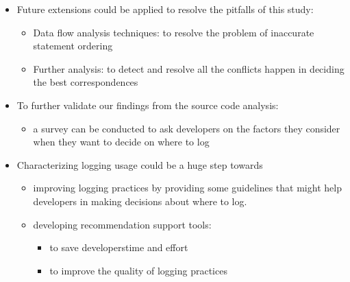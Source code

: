 \begin{itemize} [leftmargin=.01in]
\section{Future Work}  \label{fw}
\item Future extensions could be applied to resolve the pitfalls of this study:
\begin{itemize} [leftmargin=.3in]
\item Data flow analysis techniques: to resolve the problem of inaccurate statement ordering
\item Further analysis: to detect and resolve all the conflicts happen in deciding the best correspondences
\end{itemize}
\item To further validate our findings from the source code analysis:
\begin{itemize} [leftmargin=.3in]
\item a survey can be conducted to ask developers on the factors they consider when they want to decide on where to log
\end{itemize}
\item Characterizing logging usage could be a huge step towards
\begin{itemize} [leftmargin=.3in]
\item improving logging practices by providing some guidelines that might help developers in making decisions about where to
log.
\item developing recommendation support tools:
\begin{itemize} [leftmargin=.3in]
\item to save developers\textquotesingle time and effort
\item to improve the quality of logging practices
\end{itemize}
\end{itemize}
\end{itemize} 